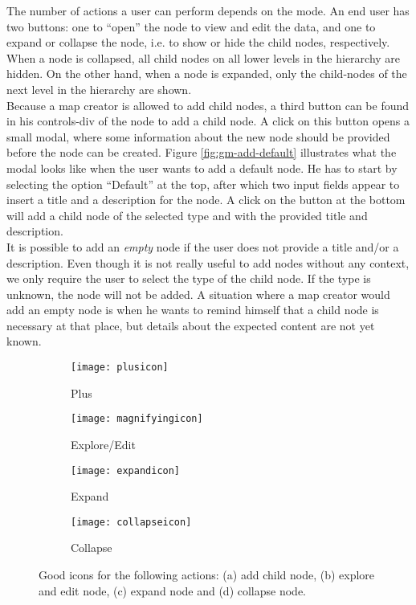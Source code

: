 The number of actions a user can perform depends on the mode. An end user has two buttons: one to ``open'' the node to view and edit the data, and one to expand or collapse the node, i.e. to show or hide the child nodes, respectively. When a node is collapsed, all child nodes on all lower levels in the hierarchy are hidden. On the other hand, when a node is expanded, only the child-nodes of the next level in the hierarchy are shown.\\

Because a map creator is allowed to add child nodes, a third button can be found in his controls-div of the node to add a child node. A click on this button opens a small modal, where some information about the new node should be provided before the node can be created. Figure \ref{fig:gm-add-default} illustrates what the modal looks like when the user wants to add a default node. He has to start by selecting the option ``Default'' at the top, after which two input fields appear to insert a title and a description for the node. A click on the button at the bottom will add a child node of the selected type and with the provided title and description.\\

It is possible to add an \textit{empty} node if the user does not provide a title and/or a description. Even though it is not really useful to add nodes without any context, we only require the user to select the type of the child node. If the type is unknown, the node will not be added. A situation where a map creator would add an empty node is when he wants to remind himself that a child node is necessary at that place, but details about the expected content are not yet known.\\

\begin{figure}[H]
	\centering
	\begin{subfigure}{.2\textwidth}
  		\centering
  		\texttt{[image: plusicon]}
  		\caption{Plus}
  		\label{fig:plusicon}
	\end{subfigure}%
	\begin{subfigure}{.2\textwidth}
  		\centering
  		\texttt{[image: magnifyingicon]}
  		\caption{Explore/Edit}
  		\label{fig:editicon}
	\end{subfigure}
	\begin{subfigure}{.2\textwidth}
		\centering
  		\texttt{[image: expandicon]}
  		\caption{Expand}
  		\label{fig:expandicon}
	\end{subfigure}
	\begin{subfigure}{.2\textwidth}
  		\centering
  		\texttt{[image: collapseicon]}
  		\caption{Collapse}
  		\label{fig:collapseicon}
	\end{subfigure}
	\caption{Good icons for the following actions: (a) add child node, (b) explore and edit node, (c) expand node and (d) collapse node.}
	\label{fig:icons}
\end{figure}

